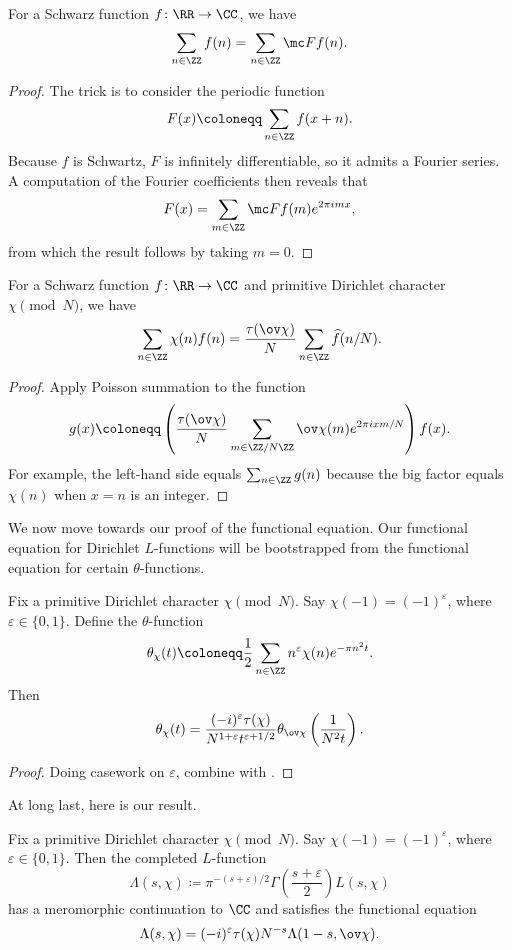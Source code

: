 \documentclass{article}
\begin{document}
\begin{proposition} \label{prop:poisson-sum}
	For a Schwarz function $f\colon\RR\to\CC$, we have
	\[\sum_{n\in\ZZ}f(n)=\sum_{n\in\ZZ}\mc Ff(n).\]
\end{proposition}
\begin{proof}
	The trick is to consider the periodic function
	\[F(x)\coloneqq\sum_{n\in\ZZ}f(x+n).\]
	Because $f$ is Schwartz, $F$ is infinitely differentiable, so it admits a Fourier series. A computation of the Fourier coefficients then reveals that
	\[F(x)=\sum_{m\in\ZZ}\mc Ff(m)e^{2\pi imx},\]
	from which the result follows by taking $m=0$.
\end{proof}
\begin{corollary} \label{cor:twisted-poisson-sum}
	For a Schwarz function $f\colon\RR\to\CC$ and primitive Dirichlet character $\chi\pmod N$, we have
	\[\sum_{n\in\ZZ}\chi(n)f(n)=\frac{\tau(\ov\chi)}N\sum_{n\in\ZZ}\widehat f(n/N).\]
\end{corollary}
\begin{proof}
	Apply Poisson summation to the function
	\[g(x)\coloneqq\left(\frac{\tau(\ov\chi)}N\sum_{m\in\ZZ/N\ZZ}\ov\chi(m)e^{2\pi ixm/N}\right)f(x).\]
	For example, the left-hand side equals $\sum_{n\in\ZZ}g(n)$ because the big factor equals $\chi(n)$ when $x=n$ is an integer.
\end{proof}
We now move towards our proof of the functional equation. Our functional equation for Dirichlet $L$-func\-tions will be boot\-strapped from the functional equation for certain $\theta$-functions.
\begin{proposition} \label{prop:theta-functional-eq}
	Fix a primitive Dirichlet character $\chi\pmod N$. Say $\chi(-1)=(-1)^\varepsilon$, where $\varepsilon\in\{0,1\}$. Define the $\theta$-function
	\[\theta_\chi(t)\coloneqq\frac12\sum_{n\in\ZZ}n^\varepsilon\chi(n)e^{-\pi n^2t}.\]
	Then
	\[\theta_\chi(t)=\frac{(-i)^\varepsilon\tau(\chi)}{N^{1+\varepsilon}t^{\varepsilon+1/2}}\theta_{\ov\chi}\left(\frac1{N^2t}\right).\]
\end{proposition}
\begin{proof}
	Doing casework on $\varepsilon$, combine  with .
\end{proof}
At long last, here is our result.
\begin{theorem}
	Fix a primitive Dirichlet character $\chi\pmod N$. Say $\chi(-1)=(-1)^\varepsilon$, where $\varepsilon\in\{0,1\}$. Then the completed $L$-function
	\[\Lambda(s,\chi)\coloneqq\pi^{-(s+\varepsilon)/2}\Gamma\left(\frac{s+\varepsilon}2\right)L(s,\chi)\]
	has a meromorphic continuation to $\CC$ and satisfies the functional equation
	\[\Lambda(s,\chi)=(-i)^\varepsilon\tau(\chi)N^{-s}\Lambda(1-s,\ov\chi).\]
\end{theorem}
\end{document}
